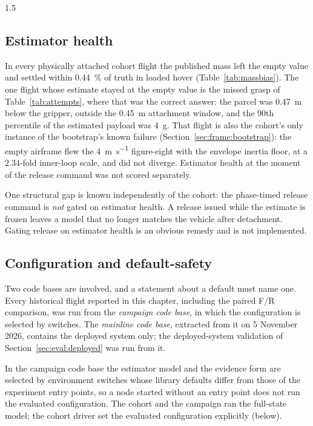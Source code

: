 \begin{spacing}{1.5}
\subsection{Estimator health}\label{sec:eval:estfail}

In every physically attached cohort flight the published mass left the empty
value and settled within \SI{0.44}{\percent} of truth in loaded hover
(Table~\ref{tab:massbias}). The one flight whose estimate stayed at the empty
value is the missed grasp of Table~\ref{tab:attempts}, where that was the correct
answer: the parcel was \SI{0.47}{\meter} below the gripper, outside the
\SI{0.45}{\meter} attachment window, and the 90th percentile of the estimated
payload was \SI{4}{\gram}. That flight is also the cohort's only instance of the bootstrap's
known failure (Section~\ref{sec:frame:bootstrap}): the empty airframe flew the
\SI{4}{\meter\per\second} figure-eight with the envelope inertia floor, at a
$2.34$-fold inner-loop scale, and did not diverge. Estimator health at the
moment of the release command was not scored separately.

One structural gap is known independently of the cohort: the phase-timed release
command is \emph{not} gated on estimator health. A release issued while the
estimate is frozen leaves a model that no longer matches the vehicle after
detachment. Gating release on estimator health is an obvious remedy and is not
implemented.

\subsection{Configuration and default-safety}\label{sec:eval:defaults}

Two code bases are involved, and a statement about a default must name one.
Every historical flight reported in this chapter, including the paired F/R
comparison, was run from the \emph{campaign code base}, in which the
configuration is selected by switches. The \emph{mainline code base}, extracted
from it on 5 November 2026, contains the deployed system only; the
deployed-system validation of Section~\ref{sec:eval:deployed} was run from it.

In the campaign code base the estimator model and the evidence form are selected
by environment switches whose library defaults differ from those of the
experiment entry points, so a node started without an entry point does not run
the evaluated configuration. The cohort and the campaign ran the full-state
model; the cohort driver set the evaluated configuration explicitly (below).


\end{spacing}
